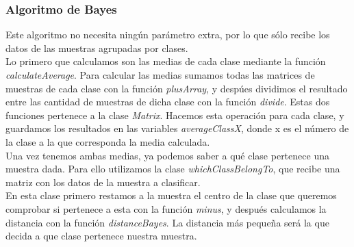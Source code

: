\documentclass[12pt]{article}
\begin{document}
\subsubsection{Algoritmo de Bayes}
Este algoritmo no necesita ningún parámetro extra, por lo que sólo recibe los datos de las muestras agrupadas por clases.\\
Lo primero que calculamos son las medias de cada clase mediante la función \textit{calculateAverage}. Para calcular las medias sumamos todas las matrices de muestras de cada clase con la función \textit{plusArray}, y despúes dividimos el resultado entre las cantidad de muestras de dicha clase con la función \textit{divide}. Estas dos funciones pertenece a la clase \textit{Matrix}. Hacemos esta operación para cada clase, y guardamos los resultados en las variables \textit{averageClassX}, donde x es el número de la clase a la que corresponda la media calculada.\\
Una vez tenemos ambas medias, ya podemos saber a qué clase pertenece una muestra dada. Para ello utilizamos la clase \textit{whichClassBelongTo}, que recibe una matriz con los datos de la muestra a clasificar.\\
En esta clase primero restamos a la muestra el centro de la clase que queremos comprobar si pertenece a esta con la función \textit{minus}, y después calculamos la distancia con la función \textit{distanceBayes}. La distancia más pequeña será la que decida a que clase pertenece nuestra muestra.
\end{document}
